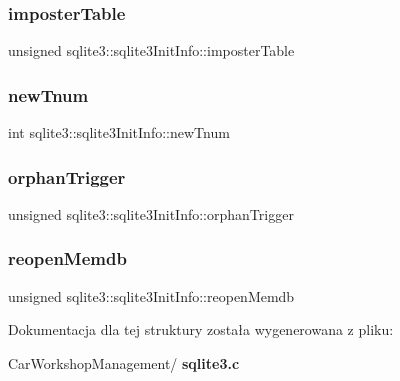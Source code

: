 \subsubsection{imposterTable}
{\footnotesize\ttfamily unsigned sqlite3\+::sqlite3\+Init\+Info\+::imposter\+Table}

\mbox{\label{structsqlite3_1_1sqlite3_init_info_a65250c8c5f215989e64294ede6c1c268}} 
\subsubsection{newTnum}
{\footnotesize\ttfamily int sqlite3\+::sqlite3\+Init\+Info\+::new\+Tnum}

\mbox{\label{structsqlite3_1_1sqlite3_init_info_ad82b2e7902a9a334061b2abf5fa488e0}} 
\subsubsection{orphanTrigger}
{\footnotesize\ttfamily unsigned sqlite3\+::sqlite3\+Init\+Info\+::orphan\+Trigger}

\mbox{\label{structsqlite3_1_1sqlite3_init_info_a102ef0d40010ee47c56252b32eb52729}} 
\subsubsection{reopenMemdb}
{\footnotesize\ttfamily unsigned sqlite3\+::sqlite3\+Init\+Info\+::reopen\+Memdb}



Dokumentacja dla tej struktury została wygenerowana z pliku\+:\begin{DoxyCompactItemize}
\item 
Car\+Workshop\+Management/\textbf{ sqlite3.\+c}\end{DoxyCompactItemize}
